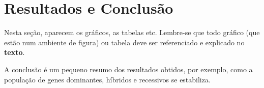 \documentclass[a4paper,12pt]{article}
\begin{document}
\section{Resultados e Conclusão}
\label{sec:resultados}

Nesta seção, aparecem os gráficos, as tabelas etc. Lembre-se que todo gráfico (que estão num ambiente de figura) ou tabela deve ser referenciado e explicado no \textbf{texto}.

A conclusão é um pequeno resumo dos resultados obtidos, por exemplo, como a população de genes dominantes, híbridos e recessivos se estabiliza.


% 

\end{document}
